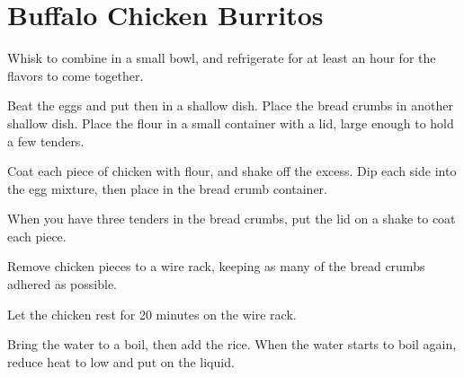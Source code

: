 

\section{Buffalo Chicken Burritos}
\begin{recipe}



Whisk to combine in a small bowl, and refrigerate for at least an hour for the flavors to come together.


Beat the eggs and put then in a shallow dish. Place the bread crumbs in another shallow dish. Place the flour in a small container with a lid, large enough to hold a few tenders.

Coat each piece of chicken with flour, and shake off the excess. Dip each side into the egg mixture, then place in the bread crumb container.

When you have three tenders in the bread crumbs, put the lid on a shake to coat each piece.

Remove chicken pieces to a wire rack, keeping as many of the bread crumbs adhered as possible.

Let the chicken rest for 20 minutes on the wire rack.


Bring the water to a boil, then add the rice. When the water starts to boil again, reduce heat to low and put on the liquid.



\end{recipe}

